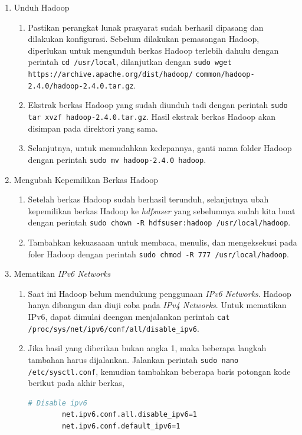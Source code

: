 \begin{enumerate}
  \item Unduh Hadoop
  \begin{enumerate}
    \item Pastikan perangkat lunak prasyarat sudah berhasil dipasang dan dilakukan konfigurasi. Sebelum dilakukan pemasangan Hadoop, diperlukan untuk mengunduh berkas Hadoop terlebih dahulu dengan perintah \verb|cd /usr/local|, dilanjutkan dengan \verb|sudo wget https://archive.apache.org/dist/hadoop/|
    \newline \verb|common/hadoop-2.4.0/hadoop-2.4.0.tar.gz|.
    \item Ekstrak berkas Hadoop yang sudah diunduh tadi dengan perintah \verb|sudo tar xvzf hadoop-2.4.0.tar.gz|. Hasil ekstrak berkas Hadoop akan disimpan pada direktori yang sama.
    \item Selanjutnya, untuk memudahkan kedepannya, ganti nama folder Hadoop dengan perintah \verb|sudo mv hadoop-2.4.0 hadoop|.
  \end{enumerate}
  \item Mengubah Kepemilikan Berkas Hadoop
  \begin{enumerate}
    \item Setelah berkas Hadoop sudah berhasil terunduh, selanjutnya ubah kepemilikan berkas Hadoop ke \textit{hdfsuser} yang sebelumnya sudah kita buat dengan perintah \verb|sudo chown -R hdfsuser:hadoop /usr/local/hadoop|.
    \item Tambahkan kekuasaaan untuk membaca, menulis, dan mengeksekusi pada foler Hadoop dengan perintah \verb|sudo chmod -R 777 /usr/local/hadoop|.
  \end{enumerate}
  \item Mematikan \textit{IPv6 Networks}
  \begin{enumerate}
    \item Saat ini Hadoop belum mendukung penggunaan \textit{IPv6 Networks}. Hadoop hanya dibangun dan diuji coba pada \textit{IPv4 Networks}. Untuk mematikan IPv6, dapat dimulai deengan menjalankan perintah \verb|cat /proc/sys/net/ipv6/conf/all/disable_ipv6|.
    \item Jika hasil yang diberikan bukan angka 1, maka beberapa langkah tambahan harus dijalankan. Jalankan perintah \verb|sudo nano /etc/sysctl.conf|, kemudian tambahkan beberapa baris potongan kode berikut pada akhir berkas,
      \begin{lstlisting}[language=bash]
    	# Disable ipv6
		net.ipv6.conf.all.disable_ipv6=1
		net.ipv6.conf.default_ipv6=1

\end{lstlisting}
\end{enumerate}
\end{enumerate}
